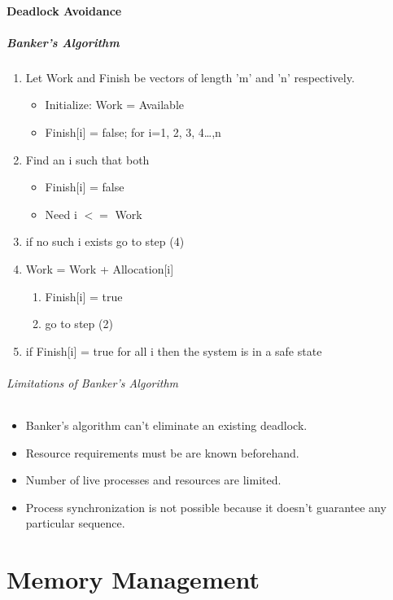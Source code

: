 \subsubsection{Deadlock Avoidance}


\paragraph{Banker's Algorithm}
\begin{enumerate}
    \item Let Work and Finish be vectors of length 'm' and 'n' respectively.
    \begin{itemize}
        \item Initialize: Work = Available
        \item Finish[i] = false; for i=1, 2, 3, 4…,n
    \end{itemize}
    \item Find an i such that both
    \begin{itemize}
        \item Finish[i] = false
        \item Need i $<=$ Work
    \end{itemize}
    \item if no such i exists go to step (4)
    \item Work = Work + Allocation[i]
    \begin{enumerate}
        \item Finish[i] = true
        \item go to step (2)
    \end{enumerate}
    \item if Finish[i] = true for all i then the system is in a safe state
\end{enumerate}

\subparagraph{Limitations of Banker's Algorithm}
\begin{itemize}
    \item Banker's algorithm can't eliminate an existing deadlock.
    \item Resource requirements must be are known beforehand.
    \item Number of live processes and resources are limited.
    \item Process synchronization is not possible because it doesn't guarantee any particular sequence.
\end{itemize}
\chapter{Memory Management}
